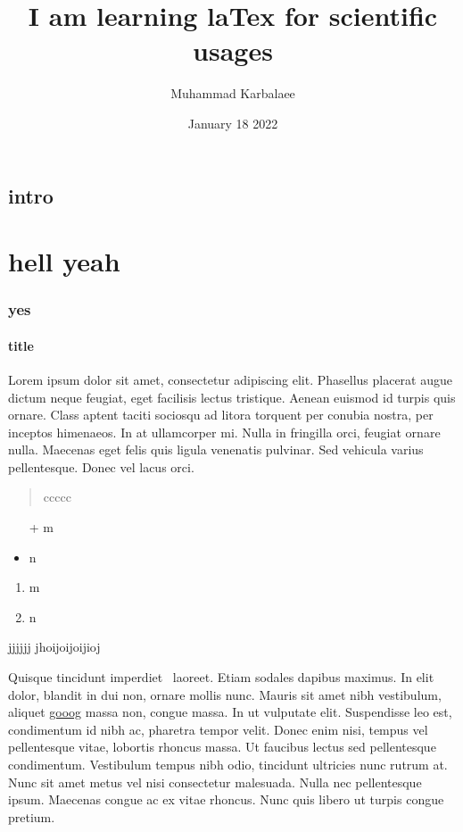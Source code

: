 \documentclass[letterpaper,12pt]{book}
\author{Muhammad Karbalaee}
\title{I am learning laTex for scientific usages}
\date{January 18 2022}
\begin{document}
	
	\maketitle
	\tableofcontents
	\section{intro}
	\chapter{hell yeah}
	\subsection{yes}
	\subsubsection{title}

	 Lorem ipsum dolor sit amet, consectetur adipiscing elit. Phasellus placerat augue dictum neque feugiat, eget facilisis lectus tristique. Aenean euismod id turpis quis ornare. Class aptent taciti sociosqu ad litora torquent per conubia nostra, per inceptos himenaeos. In at ullamcorper mi. Nulla in fringilla orci, feugiat ornare nulla. Maecenas eget felis quis ligula venenatis pulvinar. Sed vehicula varius pellentesque. Donec vel lacus orci.
	
 	\begin{quote}
 		ccccc
 	\end{quote}
	\begin{itemize}
		\item[+] m
		\item n
	\end{itemize}

	\begin{enumerate}
		\item m
		\item n
	\end{enumerate}

	\begin{description}
		\item jjjjjj jhoijoijoijioj
	\end{description}
	Quisque tincidunt imperdiet \ laoreet. Etiam sodales dapibus maximus. In elit dolor, blandit in dui non, ornare mollis nunc. Mauris sit amet nibh vestibulum, aliquet
	\href{www.google.com}{gooog} 
	massa non, congue massa. In ut vulputate elit. Suspendisse leo est, condimentum id nibh ac, pharetra tempor velit. Donec enim nisi, tempus vel pellentesque vitae, lobortis rhoncus massa. Ut faucibus lectus sed pellentesque condimentum. Vestibulum tempus nibh odio, tincidunt ultricies nunc rutrum at. Nunc sit amet metus vel nisi consectetur malesuada. Nulla nec pellentesque ipsum. Maecenas congue ac ex vitae rhoncus. Nunc quis libero ut turpis congue \\ pretium. \newpage
	
\end{document}
